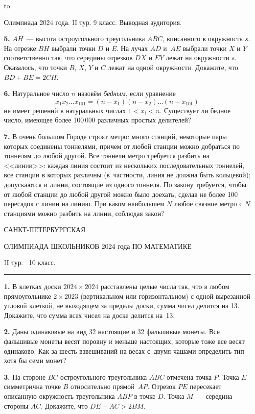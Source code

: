 \documentclass[12pt]{article}
\def\q#1.{{\bf #1. }}
\def\dotline{\smallskip\hbox to \hsize{\dotfill}\medskip}
\begin{document}
{\dotline

\centerline{Олимпиада 2024 года. II тур. 9 класс. Выводная аудитория.}
\smallskip

\q5. $AH$~--- высота остроугольного  треугольника $ABC$, вписанного в окружность $s$. На отрезке $BH$ выбрали точки $D$ и $E$. На лучах $AD$ и~$AE$ выбрали точки $X$ и $Y$ соответственно так, что середины отрезков $DX$ и $EY$ лежат на окружности $s$. Оказалось, что точки $B$, $X$, $Y$ и $C$ лежат на одной окружности. Докажите, что $BD+BE=2CH$.

\q6. Натуральное число $n$ назовём  {\it бедным}, если
уравнение
$$
x_1x_2\ldots x_{101}=(n-x_1)(n-x_2)\ldots(n-x_{101})
$$ 
не имеет решений в натуральных числах $1<x_i<n$. Существует ли бедное число, имеющее более
100\,000 различных простых делителей?

\q7. В очень большом Городе строят метро: много
станций, некоторые пары которых соединены тоннелями, причем от любой станции можно добраться по тоннелям до любой
другой. Все тоннели метро требуется разбить на <<линии>>:
каждая линия состоит из нескольких последовательных
тоннелей, все станции в которых различны (в~частности, линия не должна быть кольцевой); допускаются и линии, состоящие из одного тоннеля. По закону требуется, чтобы от любой станции
до любой другой можно было доехать, сделав не более 100
пересадок с линии на линию. При каком наибольшем $N$ любое
связное метро с $N$ станциями можно разбить на линии, соблюдая закон?
}


\clearpage

\centerline{\sc САНКТ-ПЕТЕРБУРГСКАЯ}
\centerline{\sc ОЛИМПИАДА ШКОЛЬНИКОВ 2024 года ПО МАТЕМАТИКЕ}
\centerline{\sc II тур. \ 10 класс.}
\medskip
\hrule
\medskip

\q1. В клетках доски $2024\times 2024$ расставлены целые числа так, что в 
любом прямоугольнике $2 \times 2023$ (вертикальном или горизонтальном) с одной вырезанной угловой клеткой, не выходящем за пределы доски, сумма чисел делится на 13. Докажите, что сумма всех чисел на доске делится на~13.

\q2. Даны одинаковые на вид 32 настоящие и 32 фальшивые монеты. Все фальшивые монеты весят поровну и меньше настоящих, которые тоже все весят одинаково. Как за шесть взвешиваний на весах с~двумя чашами определить тип хотя бы семи монет?

\q3. На стороне $BC$ остроугольного треугольника $ABC$ отмечена точка $P$. Точка $E$ симметрична точке $B$ относительно прямой~$AP$. Отрезок $PE$ пересекает описанную окружность треугольника $ABP$ в точке $D$. Точка $M$~--- середина стороны $AC$. Докажите, что ${DE+AC>2BM}$.
\end{document}

